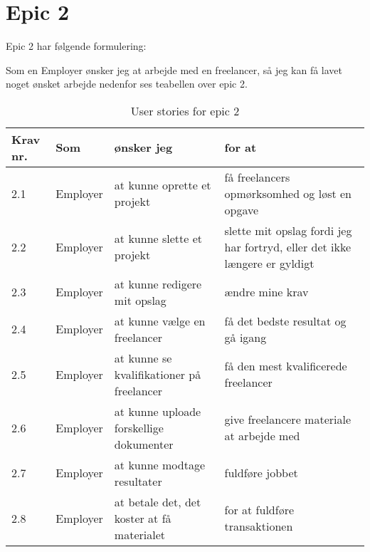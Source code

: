 
\section{Epic 2}
Epic 2 har følgende formulering:

Som en Employer ønsker jeg at arbejde med en freelancer, så jeg kan få lavet noget ønsket arbejde
nedenfor ses teabellen over epic 2.


\begin{table}[H]
    \centering
    \caption{User stories for epic 2}
    \label{tab:us-epic2}
    \begin{tabular}{p{1cm}|p{2cm}|p{6cm}|p{6cm}}
        \textbf{Krav nr.} & \textbf{Som} & \textbf{ønsker jeg}                        & \textbf{for at}                                                                                     \\
        \hline
        2.1               & Employer     & at kunne oprette et projekt                & få freelancers opmørksomhed og løst en opgave                                                       \\
        \hline
        2.2               & Employer     & at kunne slette et projekt                 & \multicolumn{1}{p{6cm}}{slette mit opslag fordi jeg har fortryd, eller det ikke længere er gyldigt} \\
        \hline
        2.3               & Employer     & at kunne redigere mit opslag               & ændre mine krav                                                                                     \\
        \hline
        2.4               & Employer     & at kunne vælge en freelancer               & få det bedste resultat og gå igang                                                                  \\
        \hline
        2.5               & Employer     & at kunne se kvalifikationer på freelancer  & få den mest kvalificerede freelancer                                                                \\
        \hline
        2.6               & Employer     & at kunne uploade forskellige dokumenter    & give freelancere materiale at arbejde med                                                           \\
        \hline
        2.7               & Employer     & at kunne modtage resultater                & fuldføre jobbet                                                                                     \\
        \hline
        2.8               & Employer     & at betale det, det koster at få materialet & for at fuldføre transaktionen                                                                       \\
    \end{tabular}
\end{table}


